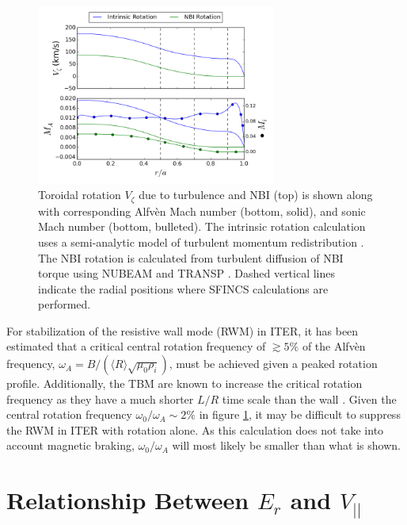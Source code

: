 \documentclass{article}
\numberwithin{figure}{section}
\numberwithin{equation}{section}
\begin{document}
\FloatBarrier

\begin{figure}[h!]
\centering
\includegraphics[width=0.7\textwidth]{rotationestimate.png}
\caption{\label{fig:rotation_estimate} Toroidal rotation $V_{\zeta}$ due to turbulence and NBI (top) is shown along with  corresponding Alfv\`{e}n Mach number (bottom, solid), and sonic Mach number (bottom, bulleted). The intrinsic rotation calculation uses a semi-analytic model of turbulent momentum redistribution \cite{Hillesheim2015}. The NBI rotation is calculated from turbulent diffusion of NBI torque using NUBEAM and TRANSP \cite{Poli2014}. Dashed vertical lines indicate the radial positions where SFINCS calculations are performed. }
\end{figure}

For stabilization of the resistive wall mode (RWM) in ITER, it has been estimated that a critical central rotation frequency of $\gtrsim5\%$ of the Alfv\`{e}n frequency, $\omega_A = B/(\langle R\rangle\sqrt{\mu_0 \rho_i})$, must be achieved given a peaked rotation profile. Additionally, the TBM are known to increase the critical rotation frequency as they have a much shorter $L/R$ time scale than the wall \cite{Liu2004}. Given the central rotation frequency $\omega_0/\omega_A \sim 2\%$ in figure \ref{fig:rotation_estimate}, it may be difficult to suppress the RWM in ITER with rotation alone. As this calculation does not take into account magnetic braking, $\omega_0/\omega_A$ will most likely be smaller than what is shown. 

\FloatBarrier

\section{Relationship Between $E_r$ and $V_{||}$}\label{Erandv}
\end{document}

